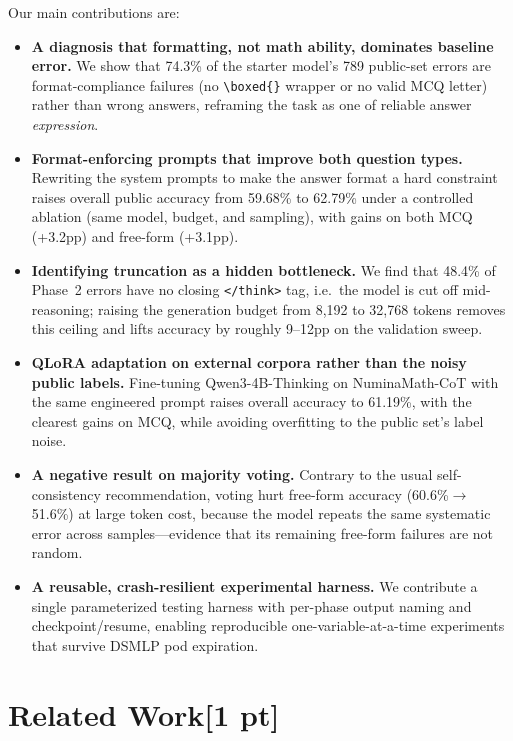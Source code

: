 \documentclass{article}
\begin{document}
{Our main contributions are:
\begin{itemize}
  \item \textbf{A diagnosis that formatting, not math ability, dominates baseline error.} We show
  that 74.3\% of the starter model's 789 public-set errors are format-compliance failures (no
  \texttt{\textbackslash boxed\{\}} wrapper or no valid MCQ letter) rather than wrong answers,
  reframing the task as one of reliable answer \emph{expression}.
  \item \textbf{Format-enforcing prompts that improve both question types.} Rewriting the system
  prompts to make the answer format a hard constraint raises overall public accuracy from 59.68\%
  to 62.79\% under a controlled ablation (same model, budget, and sampling), with gains on both MCQ
  (+3.2pp) and free-form (+3.1pp).
  \item \textbf{Identifying truncation as a hidden bottleneck.} We find that 48.4\% of Phase~2 errors
  have no closing \texttt{</think>} tag, i.e.\ the model is cut off mid-reasoning; raising the
  generation budget from 8{,}192 to 32{,}768 tokens removes this ceiling and lifts accuracy by
  roughly 9--12pp on the validation sweep.
  \item \textbf{QLoRA adaptation on external corpora rather than the noisy public labels.} Fine-tuning
  Qwen3-4B-Thinking on NuminaMath-CoT with the same engineered prompt raises overall accuracy to
  61.19\%, with the clearest gains on MCQ, while avoiding overfitting to the public set's label noise.
  \item \textbf{A negative result on majority voting.} Contrary to the usual self-consistency
  recommendation, voting hurt free-form accuracy (60.6\%$\rightarrow$51.6\%) at large token cost,
  because the model repeats the same systematic error across samples---evidence that its remaining
  free-form failures are not random.
  \item \textbf{A reusable, crash-resilient experimental harness.} We contribute a single
  parameterized testing harness with per-phase output naming and checkpoint/resume, enabling
  reproducible one-variable-at-a-time experiments that survive DSMLP pod expiration.
\end{itemize}
}
\section{Related Work[1 pt]}
\label{sec:relatedwork}
\end{document}
